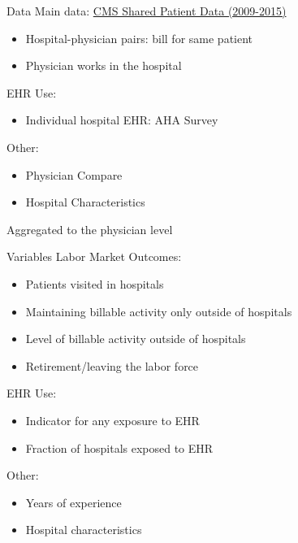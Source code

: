 \documentclass[10pt]{beamer}
\begin{document}
\begin{frame}{Data}
    Main data: \underline{CMS Shared Patient Data (2009-2015)}
    \begin{itemize}
        \item Hospital-physician pairs: bill for same patient
        \item Physician works in the hospital
    \end{itemize}
    EHR Use:
    \begin{itemize}
        \item Individual hospital EHR: AHA Survey
    \end{itemize}
    Other:
    \begin{itemize}
        \item Physician Compare
        \item Hospital Characteristics
    \end{itemize}
    
    \vspace{3mm}
    
    Aggregated to the physician level
\end{frame}


\begin{frame}{Variables}
Labor Market Outcomes:
\vspace{-2mm}
\begin{itemize}
    \item Patients visited in hospitals
    \item Maintaining billable activity only outside of hospitals
    \item \color{gray} Level of billable activity outside of hospitals
    \item \color{gray} Retirement/leaving the labor force
\end{itemize}

EHR Use:
\vspace{-2mm}
\begin{itemize}
    \item Indicator for any exposure to EHR
    \item \color{gray} Fraction of hospitals exposed to EHR
\end{itemize}

Other:
\vspace{-2mm}
\begin{itemize}
    \item Years of experience
    \item Hospital characteristics
\end{itemize}

\end{frame}
\end{document}
